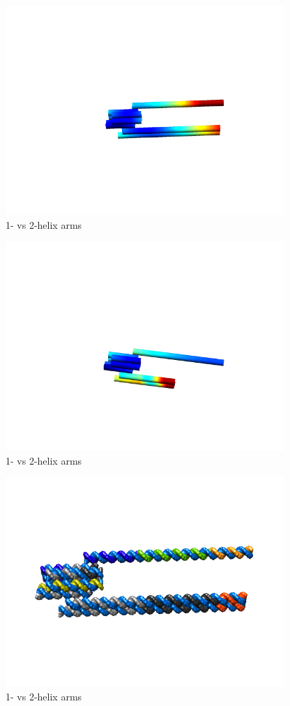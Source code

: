 \documentclass{article}
\begin{document}
\begin{figure}
\includegraphics[width=300pt]{long_heat}
\caption{1- vs 2-helix arms}
  \label{fig:long_heat}
\end{figure}

\begin{figure}
\includegraphics[width=300pt]{short_heat}
\caption{1- vs 2-helix arms}
  \label{fig:short_heat}
\end{figure}

\begin{figure}
\includegraphics[width=300pt]{long_atomic}
\caption{1- vs 2-helix arms}
  \label{fig:long_atomic}
\end{figure}
\end{document}
